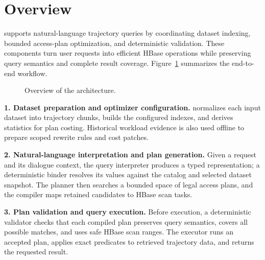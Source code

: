 \section{Overview}\label{sec:overview}

\KART{} supports natural-language trajectory queries by coordinating dataset indexing, bounded access-plan optimization, and deterministic validation. These components turn user requests into efficient HBase operations while preserving query semantics and complete result coverage. Figure~\ref{fig:kart-architecture} summarizes the end-to-end workflow.

\begin{figure}[H]
\centering
{}
\caption{Overview of the \KART{} architecture.}\label{fig:kart-architecture}
\end{figure}

\noindent\textbf{1. Dataset preparation and optimizer configuration.} \KART{} normalizes each input dataset into trajectory chunks, builds the configured indexes, and derives statistics for plan costing. Historical workload evidence is also used offline to prepare scoped rewrite rules and cost patches.

\noindent\textbf{2. Natural-language interpretation and plan generation.} Given a request and its dialogue context, the query interpreter produces a typed representation; a deterministic binder resolves its values against the catalog and selected dataset snapshot. The planner then searches a bounded space of legal access plans, and the compiler maps retained candidates to HBase scan tasks.

\noindent\textbf{3. Plan validation and query execution.} Before execution, a deterministic validator checks that each compiled plan preserves query semantics, covers all possible matches, and uses safe HBase scan ranges. The executor runs an accepted plan, applies exact predicates to retrieved trajectory data, and returns the requested result.
